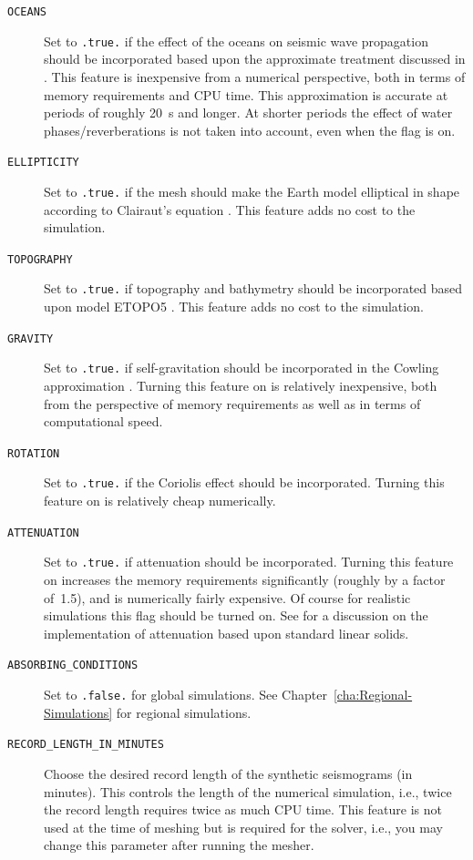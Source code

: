 \documentclass[oneside,english]{book}
\begin{document}
\begin{description}
\item [{\texttt{OCEANS}}] Set to \texttt{.true.} if the effect of the oceans
on seismic wave propagation should be incorporated based upon the
approximate treatment discussed in \citet{KoTr02b}. This feature
is inexpensive from a numerical perspective, both in terms of memory
requirements and CPU time. This approximation is accurate at periods
of roughly 20~s and longer. At shorter periods the effect of water
phases/reverberations is not taken into account, even when the flag
is on.
\item [{\texttt{ELLIPTICITY}}] Set to \texttt{.true.} if the mesh should
make the Earth model elliptical in shape according to Clairaut's equation
\citep{DaTr98}. This feature adds no cost to the simulation.
\item [{\texttt{TOPOGRAPHY}}] Set to \texttt{.true.} if topography and
bathymetry should be incorporated based upon model ETOPO5 \citep{Etopo5}.
This feature adds no cost to the simulation.
\item [{\texttt{GRAVITY}}] Set to \texttt{.true.} if self-gravitation should
be incorporated in the Cowling approximation \citep{KoTr02b,DaTr98}.
Turning this feature on is relatively inexpensive, both from the perspective
of memory requirements as well as in terms of computational speed.
\item [{\texttt{ROTATION}}] Set to \texttt{.true.} if the Coriolis effect
should be incorporated. Turning this feature on is relatively cheap
numerically.
\item [{\texttt{ATTENUATION}}] Set to \texttt{.true.} if attenuation should
be incorporated. Turning this feature on increases the memory requirements
significantly (roughly by a factor of~1.5), and is numerically fairly
expensive. Of course for realistic simulations this flag should be
turned on. See \citet{KoTr99,KoTr02a} for a discussion on the implementation
of attenuation based upon standard linear solids.
\item [{\texttt{ABSORBING\_CONDITIONS}}] Set to \texttt{.false.} for global
simulations. See Chapter~\ref{cha:Regional-Simulations} for regional
simulations.
\item [{\texttt{RECORD\_LENGTH\_IN\_MINUTES}}] Choose the desired record
length of the synthetic seismograms (in minutes). This controls the
length of the numerical simulation, i.e., twice the record length
requires twice as much CPU time. This feature is not used at the time
of meshing but is required for the solver, i.e., you may change this
parameter after running the mesher.

\end{description}
\end{document}
